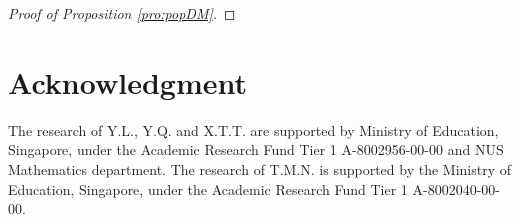 \documentclass{article}
\def\calM{\mathcal{M}}
\newcommand{\Prj}[1]{\Pi_{\mathcal{M}}(#1)}
\begin{document}
\begin{proof}[Proof of Proposition \ref{pro:popDM}]

\end{proof}



\section*{Acknowledgment}
The research of Y.L., Y.Q. and X.T.T. are supported by  Ministry of Education, Singapore, under the Academic Research Fund Tier 1 A-8002956-00-00 and NUS Mathematics department. 
The research of T.M.N. is supported by the Ministry of Education, Singapore, under the Academic Research Fund Tier 1 A-8002040-00-00.



\end{document}
